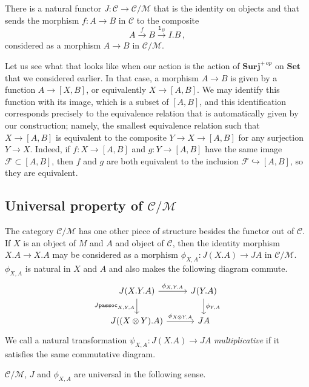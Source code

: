 \documentclass{svproc}
\newcommand\C{\mathcal{C}}
\newcommand\F{\mathcal{F}}
\newcommand\M{\mathcal{M}}
\newcommand{\passoc}{\texttt{passoc}}
\newcommand\tensor\otimes
\newcommand\lun{\texttt{l}}
\newcommand*\from{\colon}
\newcommand{\0}{{\mathtt{0}}} \newcommand{\com}{{\mathtt{com}}}
\newcommand{\catname}[1]{\mathbf{#1}}
\newcommand{\Set}{\catname{Set}}
\newcommand{\Surj}{\catname{Surj}}
\begin{document}
There is a natural functor $J\from \C \to \C/\M$ that is the identity on objects and that sends the morphism $f\from A \to B$ in $\C$ to the composite
\[
  A \xrightarrow{f}
  B \xrightarrow{\lun_B}
  I.B\,,
  \]
considered as a morphism $A\to B$ in $\C/\M$.

Let us see what that looks like when our action is the action of $\Surj^{+\,op}$ on $\Set$ that we considered earlier.  
In that case, a morphism $A\to B$ is given by a function $A \to [X,B]$, or equivalently $X \to [A,B]$.
We may identify this function with its image, which is a subset of $[A,B]$, and this identification corresponds precisely to the equivalence relation that is automatically given by our construction; namely, the smallest equivalence relation such that $X \to [A,B]$ is equivalent to the composite $Y \to X \to [A,B]$ for any surjection $Y \to X$.
Indeed, if $f\from X \to [A,B]$ and $g \from Y \to [A,B]$ have the same image $\F\subset[A,B]$, then $f$ and $g$ are both equivalent to the inclusion $\F\hookrightarrow [A,B]$, so they are equivalent.

\subsection{Universal property of $\C/\M$}

The category $\C/\M$ has one other piece of structure besides the functor out of $\C$.  
If $X$ is an object of $M$ and $A$ and object of $\C$, then the identity morphism $X.A\to X.A$ may be considered as a morphism $\phi_{X,A}\from J(X.A) \to JA$ in $\C/\M$.  
$\phi_{X,A}$ is natural in $X$ and $A$ and also makes the following diagram commute.
\[
  \begin{tikzcd}
    J(X.Y.A) \arrow[r, "\phi_{X,Y.A}"] \arrow[d, "J\passoc_{X,Y,A}"']
      & J(Y.A) \arrow[d, "\phi_{Y,A}"] \\
    J((X\tensor Y).A) \arrow[r, "\phi_{X\tensor Y,A}"]
      & JA
  \end{tikzcd}
  \]
We call a natural transformation $\psi_{X,A}\from J(X.A) \to JA$ \emph{multiplicative} if it satisfies the same commutative diagram.

$\C/\M$, $J$ and $\phi_{X,A}$ are universal in the following sense.
\end{document}
